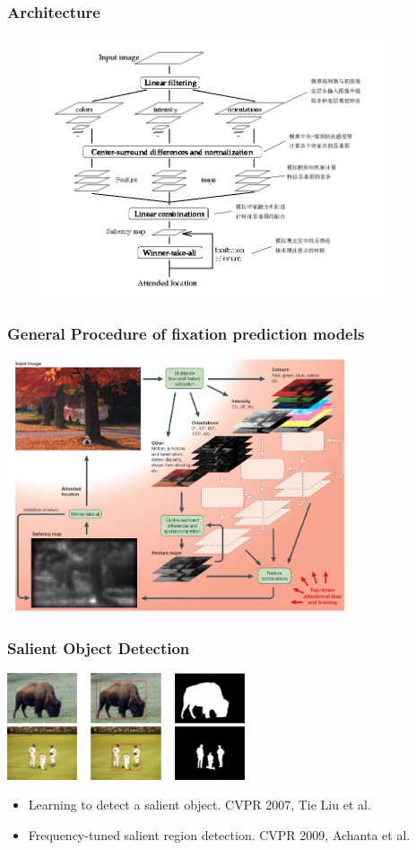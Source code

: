 \documentclass[notheorems,serif,table,compress]{beamer}  %
\begin{document}
\begin{frame}
\frametitle{Architecture}
\begin{figure}
\includegraphics[width=10cm]{ITTImodel.png}
\end{figure}
\end{frame}


\begin{frame}
\frametitle{General Procedure of fixation prediction models}
\centering\includegraphics[width=10cm]{fixationArchitecture}
\end{frame}




\begin{frame}
\frametitle{Salient Object Detection}
\centering\includegraphics[width=7cm]{FT.png}
\begin{itemize}
\item Learning to detect a salient object. CVPR 2007, Tie Liu et al.
\item Frequency-tuned salient region detection. CVPR 2009, Achanta et al.
\end{itemize}
\end{frame}
\end{document}
